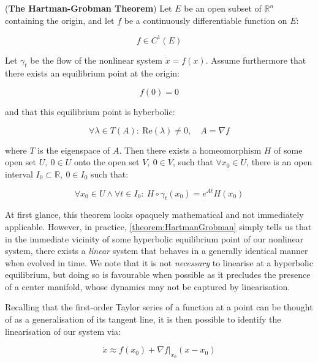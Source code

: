 \begin{theorem}\label{theorem:HartmanGrobman}
(\textbf{The Hartman-Grobman Theorem}) Let $E$ be an open subset of $\mathbb{R}^n$ containing the origin, and let $f$ be a continuously differentiable function on $E$:
 
\begin{equation*}
f \in C^1(E)
\end{equation*}

Let $\gamma_t$ be the flow of the nonlinear system $\dot{x} = f(x)$. Assume furthermore that there exists an equilibrium point at the origin: 

\begin{equation*}
f(0) = 0
\end{equation*}

and that this equilibrium point is hyberbolic: 

\begin{equation*}
\forall \lambda \in T(A): \ \text{Re}(\lambda) \neq 0, \quad A = \nabla f  
\end{equation*}

where $T$ is the eigenspace of $A$. Then there exists a homeomorphism $H$ of some open set $U, \ 0 \in U$ onto the open set $V, \ 0 \in V$, such that $\forall x_0 \in U$, there is an open interval $I_0 \subset \mathbb{R}, \ 0 \in I_0$ such that:

\begin{equation*}
	\forall x_0 \in U \wedge \forall t \in I_0: \ H \circ \gamma_t(x_0) = e^{At}H(x_0)
\end{equation*}
\end{theorem}

At first glance, this theorem looks opaquely mathematical and not immediately applicable. However, in practice, \cref{theorem:HartmanGrobman} simply tells us that in the immediate vicinity of some hyperbolic equilibrium point of our nonlinear system, there exists a \textit{linear} system that behaves in a generally identical manner when evolved in time. We note that it is not \textit{necessary} to linearise at a hyperbolic equilibrium, but doing so is favourable when possible as it precludes the presence of a center manifold, whose dynamics may not be captured by linearisation.

Recalling that the first-order Taylor series of a function at a point can be thought of as a  generalisation of its tangent line, it is then possible to identify the linearisation of our system via:

\begin{equation}\label{eq:TaylorSeries}
\dot{x} \approx f(x_0) + \nabla f\bigg\rvert_{x_0} (x-x_0)
\end{equation}

